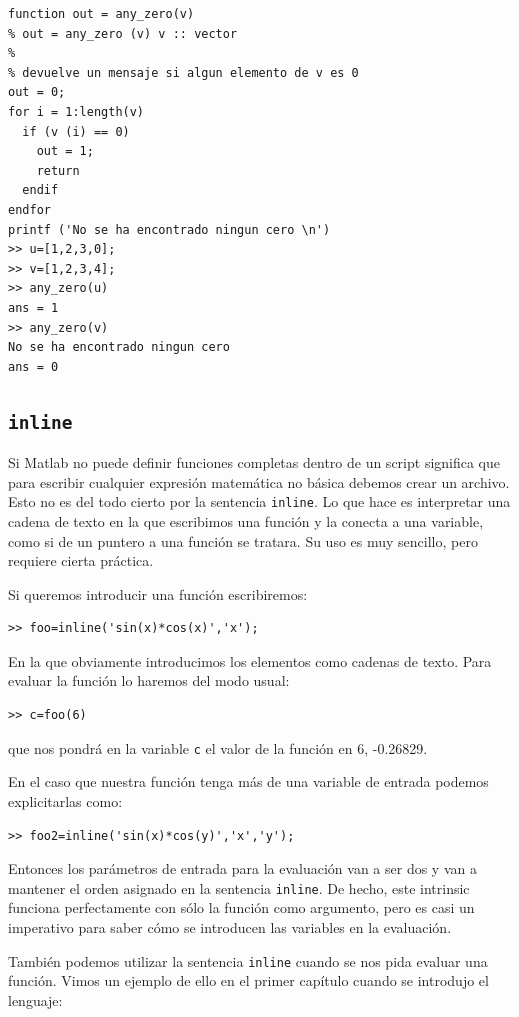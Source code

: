 \begin{verbatim}
function out = any_zero(v)
% out = any_zero (v) v :: vector
%
% devuelve un mensaje si algun elemento de v es 0
out = 0;
for i = 1:length(v)
  if (v (i) == 0)
    out = 1;
    return
  endif
endfor
printf ('No se ha encontrado ningun cero \n')   
>> u=[1,2,3,0];
>> v=[1,2,3,4];
>> any_zero(u)
ans = 1
>> any_zero(v)
No se ha encontrado ningun cero
ans = 0
\end{verbatim}

\subsection{\texttt{inline}}

Si Matlab no puede definir funciones completas dentro de un script
significa que para escribir cualquier expresión matemática no básica
debemos crear un archivo. Esto no es del todo cierto por la sentencia
\texttt{inline}. Lo que hace es interpretar una cadena de texto en la
que escribimos una función y la conecta a una variable, como si de un
puntero a una función se tratara. Su uso es muy sencillo, pero
requiere cierta práctica.

Si queremos introducir una función escribiremos:

\begin{verbatim}
>> foo=inline('sin(x)*cos(x)','x');
\end{verbatim}
En la que obviamente introducimos los elementos como cadenas de texto.
Para evaluar la función lo haremos del modo usual:

\begin{verbatim}
>> c=foo(6)
\end{verbatim}
que nos pondrá en la variable \texttt{c} el valor de la función en 6,
-0.26829.

En el caso que nuestra función tenga más de una variable de entrada
podemos explicitarlas como:

\begin{verbatim}
>> foo2=inline('sin(x)*cos(y)','x','y');
\end{verbatim}
Entonces los parámetros de entrada para la evaluación van a ser dos y
van a mantener el orden asignado en la sentencia \texttt{inline}.  De
hecho, este intrinsic funciona perfectamente con sólo la función como
argumento, pero es casi un imperativo para saber cómo se introducen
las variables en la evaluación.

También podemos utilizar la sentencia \texttt{inline} cuando se nos
pida evaluar una función. Vimos un ejemplo de ello en el primer
capítulo cuando se introdujo el lenguaje:

